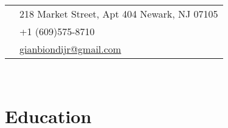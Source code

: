 \documentclass[10pt]{article} %
\begin{document}
{\begin{minipage}[t]{0.5\textwidth}
%
%


\end{minipage} %
\hfill
\begin{minipage}[t]{0.44\textwidth} %
\vspace{0pt} %


\colorbox{shade}{\textcolor{text1}{
\begin{tabular}{c|p{7cm}}
\raisebox{-4pt}{\textifsymbol{18}} & 218 Market Street, Apt 404 Newark, NJ 07105 \\ %
\raisebox{-3pt}{\Mobilefone} & +1 (609)575-8710 \\ %
\raisebox{-1pt}{\Letter} & \href{mailto:gianbiondijr@gmail.com}{gianbiondijr@gmail.com} \\ %
\end{tabular}
}
}\\[10pt]


\section{Education} 

\begin{tabular}{rl} %


\end{tabular}
\end{minipage}}
\end{document}
